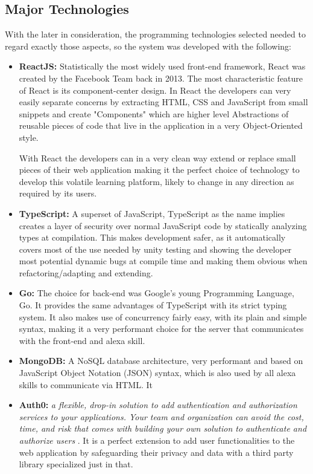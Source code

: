 \subsection{Major Technologies}
With the later in consideration, the programming technologies selected needed to regard
exactly those aspects, so the system was developed with the following:


\begin{itemize}
\item \textbf{ReactJS:} Statistically the most widely used front-end framework, React
    was created by the Facebook Team back in 2013. The most characteristic feature 
    of React is its component-center design. In React the developers can very easily
    separate concerns by extracting HTML, CSS and JavaScript from small snippets and
    create "Components" which are higher level Abstractions of reusable pieces of code
    that live in the application in a very Object-Oriented style.

    With React the developers can in a very clean way extend or replace small pieces 
    of their web application making it the perfect choice of technology to develop this
    volatile learning platform, likely to change in any direction as required by its
    users.

\item \textbf{TypeScript:} A superset of JavaScript, TypeScript as the name implies
    creates a layer of security over normal JavaScript code by statically analyzing 
    types at compilation. This makes development safer, as it automatically covers 
    most of the use needed by unity testing and showing the developer most potential dynamic 
    bugs at compile time and making them obvious when refactoring/adapting and 
    extending.


\item \textbf{Go:} The choice for back-end was Google's young Programming Language, Go.
    It provides the same advantages of TypeScript with its strict typing system. 
    It also makes use of concurrency fairly easy, with its plain and simple syntax, making
    it a very performant choice for the server that communicates with the front-end 
    and alexa skill.

\item \textbf{MongoDB:} A NoSQL database architecture, very performant and based on
    JavaScript Object Notation (JSON) syntax, which is also used by all alexa skills to
    communicate via HTML. It 

\item \textbf{Auth0:} \textit{a flexible, drop-in solution to add authentication and 
    authorization services to your applications. Your team and organization can 
    avoid the cost, time, and risk that comes with building your own solution to 
    authenticate and authorize users} \cite{auth0}. It is a perfect extension to add user 
    functionalities to the web application by safeguarding their privacy and data with
    a third party library specialized just in that.


\end{itemize}

